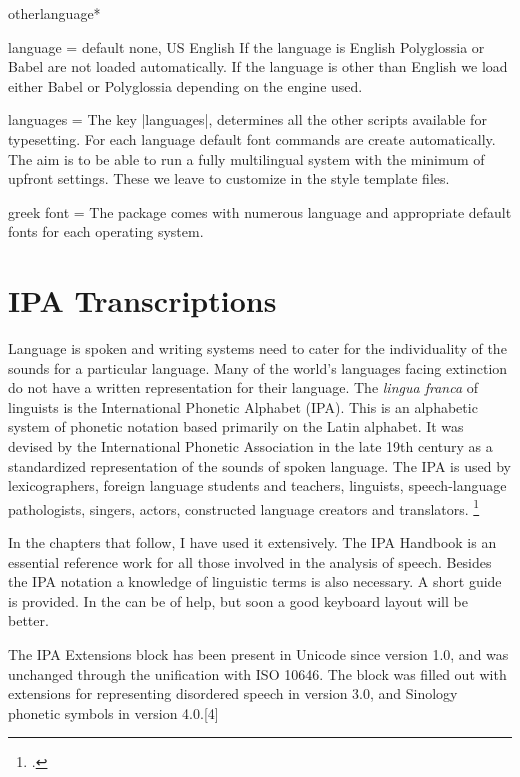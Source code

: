 \begin{docCommandd}{otherlanguage*} { }
\begin{docKey}{language}{ =}  {default none, US English}
If the language is English Polyglossia or Babel are not loaded automatically. If the language is other than English we load either Babel or Polyglossia depending on the engine used.
\end{docKey}


\begin{docKey}{languages}{ = }  {}
The key |languages|, determines all the other scripts available for typesetting. For each language default font commands are create automatically. The aim is to be able to run a fully multilingual system with the minimum of upfront settings. These we leave to customize in the style template files.
\end{docKey}

\begin{docKey}{greek font}{ = }  {}
The package comes with numerous language and appropriate default fonts
for each operating system. 
\end{docKey}



\section{IPA Transcriptions}

Language is spoken and writing systems need to cater for the individuality of the sounds for a particular language. Many of the world's languages facing extinction do not have a written representation for their language. The \textit{lingua franca} of linguists is the  International Phonetic Alphabet (IPA). This is an alphabetic system of phonetic notation based primarily on the Latin alphabet. It was devised by the International Phonetic Association in the late 19th century as a standardized representation of the sounds of spoken language. The IPA is used by lexicographers, foreign language students and teachers, linguists, speech-language pathologists, singers, actors, constructed language creators and translators. \footcite{ipa}

In the chapters that follow, I have used it extensively. The IPA Handbook is an essential reference work for all those involved in the analysis of speech. Besides the IPA notation a knowledge of linguistic terms is also necessary. A short guide is provided. In \latex the  can be of help, but soon a good keyboard layout will be better.

The IPA Extensions block has been present in Unicode since version 1.0, and was unchanged through the unification with ISO 10646. The block was filled out with extensions for representing disordered speech in version 3.0, and Sinology phonetic symbols in version 4.0.[4]


\end{docCommandd}
